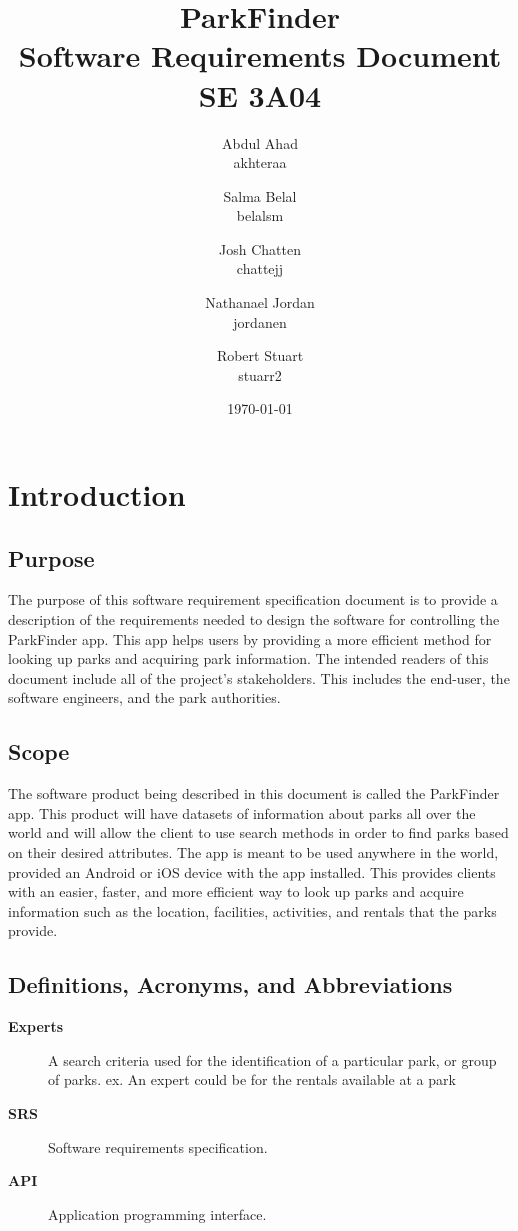 \documentclass[titlepage]{article}
\title{ParkFinder\\Software Requirements Document\\SE 3A04}
\author{Abdul Ahad \\ akhteraa \and Salma Belal \\ belalsm \and Josh Chatten \\
chattejj \and Nathanael Jordan \\ jordanen \and Robert Stuart \\ stuarr2}
\date{\today}
\begin{document}
\maketitle	
\thispagestyle{empty}
\clearpage
\setcounter{tocdepth}{2}%
\tableofcontents
\clearpage

\section{Introduction}
\label{sec:introduction}


\subsection{Purpose}
\label{sub:purpose}
The purpose of this software requirement specification document is to provide a description of the
requirements needed to design the software for controlling the ParkFinder app. This app helps users
by providing a more efficient method for looking up parks and acquiring park information.
\newline\newline
The intended readers of this document include all of the project's stakeholders. This includes the
end-user, the software engineers, and the park authorities.

\subsection{Scope}
\label{sub:scope}
The software product being described in this document is called the ParkFinder app. This product
will have datasets of information about parks all over the world and will allow the client to use
search methods in order to find parks based on their desired attributes. The app is meant to be used
anywhere in the world, provided an Android or iOS device with the app installed. This provides
clients with an easier, faster, and more efficient way to look up parks and acquire information such
as the location, facilities, activities, and rentals that the parks provide.

\subsection{Definitions, Acronyms, and Abbreviations}
\label{sub:definitions_acronyms_and_abbreviations}
\begin{description}
    \item[\textbf{Experts}] A search criteria used for the identification of a particular park, or
    group of parks. ex. An expert could be for the rentals available at a park
    \item[\textbf{SRS}] Software requirements specification.
    \item[\textbf{API}] Application programming interface.
\end{description}
\end{document}
